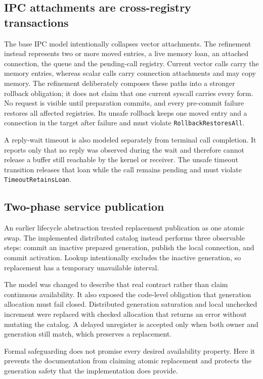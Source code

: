 \subsection{IPC attachments are cross-registry transactions}

The base IPC model intentionally collapses vector attachments. The
 refinement instead represents two or more
moved entries, a live memory loan, an attached connection, the queue and the
pending-call registry. Current vector calls carry the memory entries, whereas
scalar calls carry connection attachments and may copy memory. The refinement
deliberately composes these paths into a stronger rollback obligation; it does
not claim that one current syscall carries every form. No request is visible
until preparation commits, and every pre-commit failure restores all affected
registries. Its unsafe rollback keeps one moved entry and a connection in the
target after failure and must violate \texttt{RollbackRestoresAll}.

A reply-wait timeout is also modeled separately from terminal call completion.
It reports only that no reply was observed during the wait and therefore cannot
release a buffer still reachable by the kernel or receiver. The unsafe timeout
transition releases that loan while the call remains pending and must violate
\texttt{TimeoutRetainsLoan}.

\subsection{Two-phase service publication}

An earlier lifecycle abstraction treated replacement publication as one
atomic swap. The implemented distributed catalog instead performs three
observable steps: commit an inactive prepared generation, publish the local
connection, and commit activation. Lookup intentionally excludes the inactive
generation, so replacement has a temporary unavailable interval.

The model was changed to describe that real contract rather than claim
continuous availability. It also exposed the code-level obligation that
generation allocation must fail closed. Distributed generation saturation and
local unchecked increment were replaced with checked allocation that returns
an error without mutating the catalog. A delayed unregister is accepted only
when both owner and generation still match, which preserves a replacement.

Formal safeguarding does not promise every desired availability property. Here it
prevents the documentation from claiming atomic replacement and protects the
generation safety that the implementation does provide.

